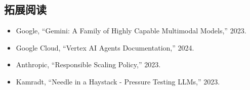 \documentclass[a4paper]{article}
\begin{document}
\subsection{拓展阅读}

\begin{itemize}
    \item Google, ``Gemini: A Family of Highly Capable Multimodal Models,'' 2023.
    \item Google Cloud, ``Vertex AI Agents Documentation,'' 2024.
    \item Anthropic, ``Responsible Scaling Policy,'' 2023.
    \item Kamradt, ``Needle in a Haystack - Pressure Testing LLMs,'' 2023.
\end{itemize}
\end{document}
